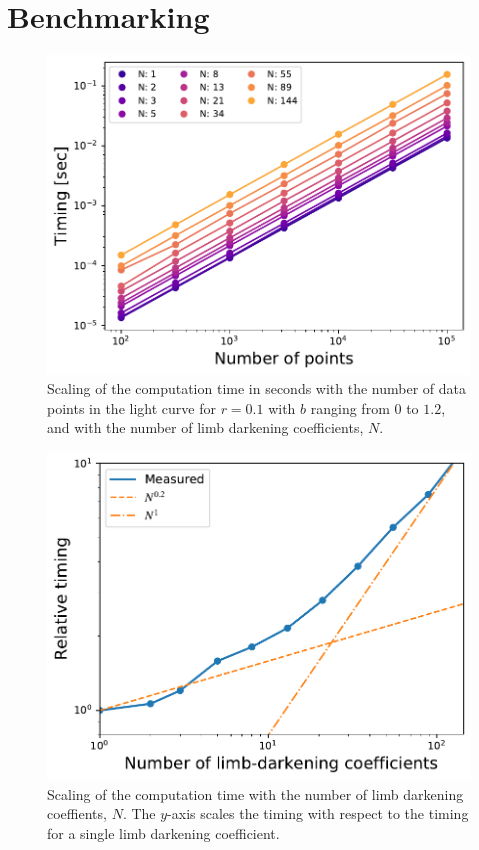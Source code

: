 \documentclass[modern,trackchanges]{aastex63}
\begin{document}

\section{Benchmarking}
\label{sec:benchmark}

\begin{figure}
    \begin{centering}
    \includegraphics[width=0.7\linewidth]{figures/julia/benchmark_transit_poly.pdf}
    \caption{Scaling of the computation time in seconds with the number of
    data points in the light curve for $r=0.1$ with $b$ ranging from $0$ to $1.2$,
    and with the number of limb darkening coefficients, $N$. 
    \label{fig:ncoeff}}
    \end{centering}
\end{figure}

\begin{figure}
    \begin{centering}
    \includegraphics[width=0.7\linewidth]{figures/julia/benchmark_limbdark_timing.pdf}
    \caption{Scaling of the computation time with the number of
    limb darkening coeffients, $N$.  The $y$-axis scales the timing with respect
    to the timing for a single limb darkening coefficient. 
    \label{fig:nlimb}}
    \end{centering}
\end{figure}
\end{document}
